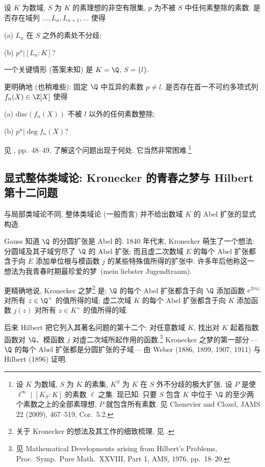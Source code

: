 设 $K$ 为数域, $S$ 为 $K$ 的素理想的非空有限集, $p$ 为不被 $S$ 中任何素整除的素数. 是否存在域列 $\ldots,L_n,L_{n+1},\ldots$ 使得

(a) $L_n$ 在 $S$ 之外的素处不分歧;

(b) $p^n|[L_n:K]$?

一个关键情形 (答案未知) 是 $K=\Q$, $S=\{l\}$.

更明确地 (也稍难些): 固定 $\Q$ 中互异的素数 $p\ne l$. 是否存在首一不可约多项式列 $f_n(X)\in\Z[X]$ 使得

(a) $\mathrm{disc}(f_n(X))$ 不被 $l$ 以外的任何素数整除;

(b) $p^n|\deg f_n(X)$?

见 \cite{Milne2006}, pp.~48--49, 了解这个问题出现于何处. 它当然非常困难.\footnote{设 $K$ 为数域, $S$ 为 $K$ 的素集, $K^S$ 为 $K$ 在 $S$ 外不分歧的极大扩张. 设 $P$ 是使 $\ell^\infty\mid [K_S:K]$ 的素数 $\ell$ 之集. 现已知: 只要 $S$ 包含 $K$ 中位于 $\Q$ 的至少两个素数之上的全部素理想, $P$ 就包含所有素数. 见 Chenevier and Clozel, JAMS 22 (2009), 467--519, Cor.~5.2.}

\subsection*{显式整体类域论: Kronecker 的青春之梦与 Hilbert 第十二问题}

与局部类域论不同, 整体类域论 (一般而言) 并不给出数域 $K$ 的 Abel 扩张的显式构造.

Gauss 知道 $\Q$ 的分圆扩张是 Abel 的. 1840 年代末, Kronecker 萌生了一个想法: 分圆域及其子域穷尽了 $\Q$ 的 Abel 扩张; 而且虚二次数域 $E$ 的每个 Abel 扩张都含于向 $E$ 添加单位根与模函数 $j$ 的某些特殊值所得的扩张中. 许多年后他称这一想法为\guillemotleft 我青春时期最珍爱的梦\guillemotright\ (mein liebster Jugendtraum).

更精确地说, Kronecker 之梦\footnote{关于 Kronecker 的想法及其工作的细致梳理, 见 \cite{Schappacher1998}.} 是: $\Q$ 的每个 Abel 扩张都含于向 $\Q$ 添加函数 $e^{2\pi iz}$ 对所有 $z\in\Q^{\times}$ 的值所得的域; 虚二次域 $K$ 的每个 Abel 扩张都含于向 $K$ 添加函数 $j(z)$ 对所有 $z\in K^{\times}$ 的值所得的域.

后来 Hilbert 把它列入其著名问题的第十二个: 对任意数域 $K$, 找出对 $K$ 起着指数函数对 $\Q$、模函数 $j$ 对虚二次域所起作用的函数.\footnote{见 Mathematical Developments arising from Hilbert's Problems, Proc.~Symp.~Pure Math.~XXVIII, Part 1, AMS, 1976, pp.~18--20.} Kronecker 之梦的第一部分\,---\,$\Q$ 的每个 Abel 扩张都是分圆扩张的子域\,---\,由 Weber (1886, 1899, 1907, 1911) 与 Hilbert (1896) 证明.


